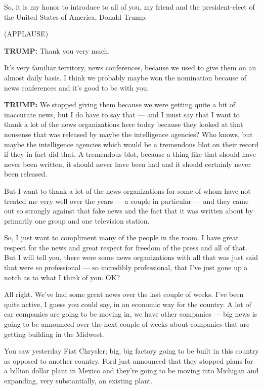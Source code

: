 So, it is my honor to introduce to all of you, my friend and the
president-elect of the United States of America, Donald Trump.

(APPLAUSE)

\textbf{TRUMP:} Thank you very much.

It's very familiar territory, news conferences, because we used to give
them on an almost daily basis. I think we probably maybe won the
nomination because of news conferences and it's good to be with you.

\textbf{TRUMP:} We stopped giving them because we were getting quite a
bit of inaccurate news, but I do have to say that --- and I must say
that I want to thank a lot of the news organizations here today because
they looked at that nonsense that was released by maybe the intelligence
agencies? Who knows, but maybe the intelligence agencies which would be
a tremendous blot on their record if they in fact did that. A tremendous
blot, because a thing like that should have never been written, it
should never have been had and it should certainly never been released.

But I want to thank a lot of the news organizations for some of whom
have not treated me very well over the years --- a couple in particular
--- and they came out so strongly against that fake news and the fact
that it was written about by primarily one group and one television
station.

So, I just want to compliment many of the people in the room. I have
great respect for the news and great respect for freedom of the press
and all of that. But I will tell you, there were some news organizations
with all that was just said that were so professional --- so incredibly
professional, that I've just gone up a notch as to what I think of you.
OK?

All right. We've had some great news over the last couple of weeks. I've
been quite active, I guess you could say, in an economic way for the
country. A lot of car companies are going to be moving in, we have other
companies --- big news is going to be announced over the next couple of
weeks about companies that are getting building in the Midwest.

You saw yesterday Fiat Chrysler; big, big factory going to be built in
this country as opposed to another country. Ford just announced that
they stopped plans for a billion dollar plant in Mexico and they're
going to be moving into Michigan and expanding, very substantially, an
existing plant.

